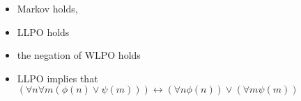 \begin{itemize}
  \item Markov holds, 
  \item LLPO holds 
  \item the negation of WLPO holds
\end{itemize}

\begin{itemize}
  \item LLPO implies that 
    $
    (\forall n \forall m ( \phi(n) \vee \psi(m)) )
    \leftrightarrow 
    (\forall n \phi(n))  \vee (\forall m \psi(m))
    $
\end{itemize}
